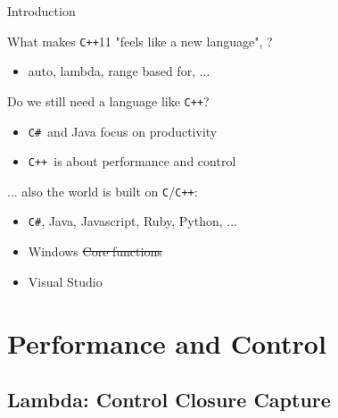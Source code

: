 \documentclass[svgnames,smaller]{beamer}
\newcommand*{\cpp}{\texttt{C++}}
\newcommand*{\csharp}{\texttt{C\#}}
\begin{document}
\begin{frame}[fragile]{Introduction}
  \begin{block}{What makes \cpp11 "feels like a new language",
      \citeauthor{stroustrup-think} \cite{stroustrup-think} ?}
    \begin{itemize}
    \item auto, lambda, range based for, ...
    \end{itemize}
  \end{block}

  \begin{alertblock}{Do we still need a language like \cpp ?}
    \begin{itemize}
    \item \csharp\  and Java focus on productivity
    \item \cpp\  is about performance and control
    \end{itemize}
  \end{alertblock}

  ... also the world is built on \texttt{C}/\cpp:
  \begin{itemize}
  \item \csharp, Java, Javascript, Ruby, Python, ... %
  \item Windows \sout{Core functions} \cite{sutter-why}
  \item Visual Studio %
  \end{itemize}

\end{frame}

\section{Performance and Control}

\subsection{Lambda: Control Closure Capture}
\end{document}
